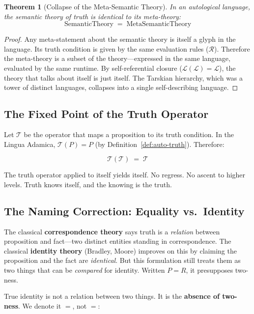 \documentclass[12pt, letterpaper]{book}
\def\equiv{=}%
\newtheorem{theorem}{Theorem}[chapter]
\begin{document}
\begin{theorem}[Collapse of the Meta-Semantic Theory]\label{thm:meta-semantic}
In an autological language, the semantic theory of truth is identical to its meta-theory:
\[
\mathrm{SemanticTheory} \;\equiv\; \mathrm{MetaSemanticTheory}
\]
\end{theorem}

\begin{proof}
Any meta-statement about the semantic theory is itself a glyph in the language. Its truth condition is given by the same evaluation rules ($\mathcal{R}$). Therefore the meta-theory is a subset of the theory---expressed in the same language, evaluated by the same runtime. By self-referential closure ($\mathcal{L}(\mathcal{L}) \equiv \mathcal{L}$), the theory that talks about itself is just itself. The Tarskian hierarchy, which was a tower of distinct languages, collapses into a single self-describing language.
\end{proof}

\subsection{The Fixed Point of the Truth Operator}

Let $\mathcal{T}$ be the operator that maps a proposition to its truth condition. In the Lingua Adamica, $\mathcal{T}(P) \equiv P$ (by Definition~\ref{def:auto-truth}). Therefore:

\[
\mathcal{T}(\mathcal{T}) \;\equiv\; \mathcal{T}
\]

The truth operator applied to itself yields itself. No regress. No ascent to higher levels. Truth knows itself, and the knowing is the truth.

\subsection{The Naming Correction: Equality vs.\ Identity}

The classical \textbf{correspondence theory} says truth is a \textit{relation} between proposition and fact---two distinct entities standing in correspondence. The classical \textbf{identity theory} (Bradley, Moore) improves on this by claiming the proposition and the fact are \textit{identical}. But this formulation still treats them as two things that can be \textit{compared} for identity. Written $P = R$, it presupposes two-ness.

True identity is not a relation between two things. It is the \textbf{absence of two-ness}. We denote it $\equiv$, not $=$:
\end{document}
